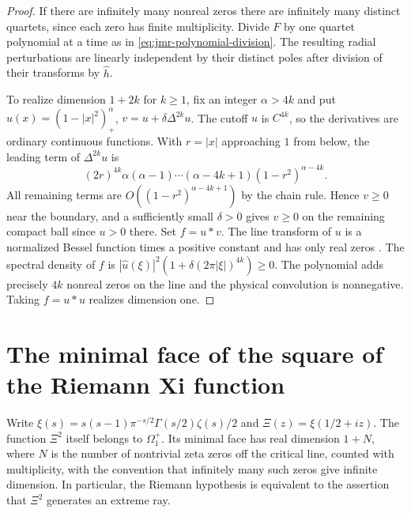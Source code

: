 \documentclass[11pt,a4paper]{article}
\numberwithin{equation}{section}
\begin{document}
\begin{proof}
If there are infinitely many nonreal zeros there are infinitely many distinct quartets, since each zero has finite multiplicity. Divide $F$ by one quartet polynomial at a time as in \eqref{eq:jmr-polynomial-division}. The resulting radial perturbations are linearly independent by their distinct poles after division of their transforms by $\widehat h$.

To realize dimension $1+2k$ for $k\ge1$, fix an integer $\alpha>4k$ and put $u(x)=(1-|x|^2)_+^\alpha$, $v=u+\delta\Delta^{2k}u$. The cutoff $u$ is $C^{4k}$, so the derivatives are ordinary continuous functions. With $r=|x|$ approaching $1$ from below, the leading term of $\Delta^{2k}u$ is
\[
 (2r)^{4k}\alpha(\alpha-1)\cdots(\alpha-4k+1)(1-r^2)^{\alpha-4k}.
\]
All remaining terms are $O((1-r^2)^{\alpha-4k+1})$ by the chain rule. Hence $v\ge0$ near the boundary, and a sufficiently small $\delta>0$ gives $v\ge0$ on the remaining compact ball since $u>0$ there. Set $f=u*v$. The line transform of $u$ is a normalized Bessel function times a positive constant and has only real zeros \cite[Cor.~3.3]{JMR2009}. The spectral density of $f$ is $|\widehat u(\xi)|^2(1+\delta(2\pi |\xi|)^{4k})\ge0$. The polynomial adds precisely $4k$ nonreal zeros on the line and the physical convolution is nonnegative. Taking $f=u*u$ realizes dimension one.
\end{proof}

\section{The minimal face of the square of the Riemann Xi function}
\label{sec:xi-face}
Write $\xi(s)=s(s-1)\pi^{-s/2}\Gamma(s/2)\zeta(s)/2$ and
$\Xi(z)=\xi(1/2+iz)$. The function $\Xi^2$ itself belongs to
$\Omega_1^+$. Its minimal face has real dimension $1+N$, where $N$
is the number of nontrivial zeta zeros off the critical line, counted
with multiplicity, with the convention that infinitely many such zeros
give infinite dimension. In particular, the Riemann hypothesis is
equivalent to the assertion that $\Xi^2$ generates an extreme ray.
\end{document}
